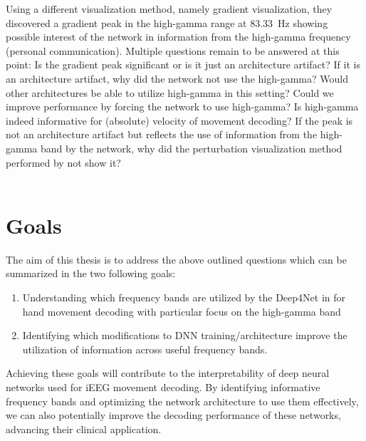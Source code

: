 Using a different visualization method, namely gradient visualization, they discovered a gradient peak in the high-gamma range at 83.33~Hz showing possible interest of the network in information from the high-gamma frequency (personal communication).
Multiple questions remain to be answered at this point: Is the gradient peak significant or is it just an architecture artifact?
If it is an architecture artifact, why did the network not use the high-gamma?
Would other architectures be able to utilize high-gamma in this setting?
Could we improve performance by forcing the network to use high-gamma?
Is high-gamma indeed informative for (absolute) velocity of movement decoding? 
If the peak is not an architecture artifact but reflects the use of information from the high-gamma band by the network, why did the perturbation visualization method performed by \cite{Hammer-2021} not show it?\\
\\


\section*{Goals}
The aim of this thesis is to address the above outlined questions which can be summarized in the two following goals:

\begin{enumerate}
    \item Understanding which frequency bands are utilized by the Deep4Net in \cite{Hammer-2021} for hand movement decoding with particular focus on the high-gamma band 
    \item Identifying which modifications to DNN training/architecture improve the utilization of information across useful frequency bands.
\end{enumerate}

Achieving these goals will contribute to the interpretability of deep neural networks used for iEEG movement decoding.
By identifying informative frequency bands and optimizing the network architecture to use them effectively, we can also potentially improve the decoding performance of these networks, advancing their clinical application.

